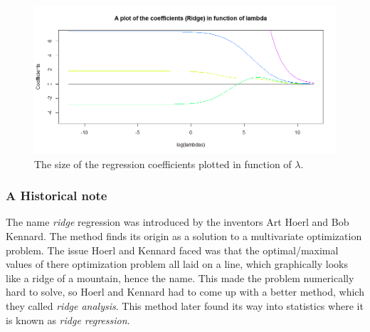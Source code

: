 \begin{figure}
    \centering
    \includegraphics[width=\linewidth]{Figures/CoeffRidgeIFOLambda.png}
    \caption{The size of the regression coefficients plotted in function of $\lambda$.}
    \label{fig:CoeffRidge}
\end{figure}


\subsubsection{A Historical note}
The name \textit{ridge} regression was introduced by the inventors Art Hoerl and Bob Kennard. The method finds its origin as a solution to a multivariate optimization problem. The issue Hoerl and Kennard faced was that the optimal/maximal values of there optimization problem all laid on a line, which graphically looks like a ridge of a mountain, hence the name. This made the problem numerically hard to solve, so Hoerl and Kennard had to come up with a better method, which they called \textit{ridge analysis}. This method later found its way into statistics where it is known as \textit{ridge regression}.~\cite{Hoerl2020}


